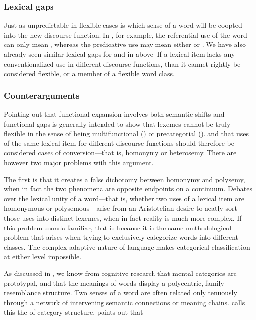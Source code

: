 \subsubsection{Lexical gaps}
\label{sec:2.3.3.3}

Just as unpredictable in flexible cases is which sense of a word will be coopted into the new discourse function. In , for example, the referential use of the word  can only mean , whereas the predicative use may mean either  or  \parencite[91]{Kihm2017}. We have also already seen similar lexical gaps for  and  in  above. If a lexical item lacks any conventionalized use in different discourse functions, than it cannot rightly be considered flexible, or a member of a flexible word class.

\subsubsection{Counterarguments}
\label{sec:2.3.3.4}

Pointing out that functional expansion involves both semantic shifts and functional gaps is generally intended to show that lexemes cannot be truly flexible in the sense of being multifunctional () or precategorial (), and that uses of the same lexical item for different discourse functions should therefore be considered cases of conversion—that is, homonymy or heterosemy. There are however two major problems with this argument.

The first is that it creates a false dichotomy between homonymy and polysemy, when in fact the two phenomena are opposite endpoints on a continuum. Debates over the lexical unity of a word—that is, whether two uses of a lexical item are homonymous or polysemous—arise from an Aristotelian desire to neatly sort those uses into distinct lexemes, when in fact reality is much more complex. If this problem sounds familiar, that is because it is the same methodological problem that arises when trying to exclusively categorize words into different classes. The complex adaptive nature of language makes categorical classification at either level impossible.

As discussed in , we know from cognitive research that mental categories are prototypal, and that the meanings of words display a polycentric, family resemblance structure. Two senses of a word are often related only tenuously through a network of intervening semantic connections or meaning chains. \textcite{Langacker1988} calls this the  of category structure. \citeauthor{Taylor2003} points out that 

